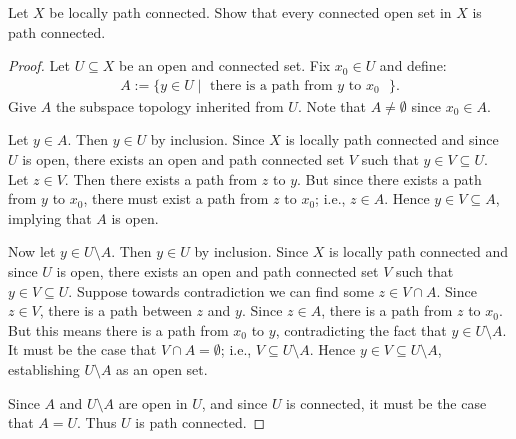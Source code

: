 \documentclass[10pt,oneside,openany]{memoir}
\begin{document}
\begin{exercise}[manual-num={4}]
Let $X$ be locally path connected. Show that every connected open set in $X$ is path connected.
\end{exercise}
    \begin{proof}
        Let $U \subseteq X$ be an open and connected set. Fix $x_0 \in U$ and define:
            \begin{equation*}
            \begin{split}
                A := \{y \in U \mid \text{ there is a path from $y$ to $x_0$ }\}.
            \end{split}
            \end{equation*}
        Give $A$ the subspace topology inherited from $U$. Note that $A \neq \emptyset$ since $x_0 \in A$.

        Let $y \in A$. Then $y \in U$ by inclusion. Since $X$ is locally path connected and since $U$ is open, there exists an open and path connected set $V$ such that $y \in V \subseteq U$. Let $z \in V$. Then there exists a path from $z$ to $y$. But since there exists a path from $y$ to $x_0$, there must exist a path from $z$ to $x_0$; i.e., $z \in A$. Hence $y \in V \subseteq A$, implying that $A$ is open.

        Now let $y \in U \setminus A$. Then $y \in U$ by inclusion. Since $X$ is locally path connected and since $U$ is open, there exists an open and path connected set $V$ such that $y \in V \subseteq U$. Suppose towards contradiction we can find some $z \in V \cap A$. Since $z \in V$, there is a path between $z$ and $y$. Since $z \in A$, there is a path from $z$ to $x_0$. But this means there is a path from $x_0$ to $y$, contradicting the fact that $y \in U \setminus A$. It must be the case that $V \cap A = \emptyset$; i.e., $V \subseteq U \setminus A$. Hence $y \in V \subseteq U \setminus A$, establishing $U\setminus A$ as an open set.

        Since $A$ and $U\setminus A$ are open in $U$, and since $U$ is connected, it must be the case that $A = U$. Thus $U$ is path connected.
    \end{proof}
\end{document}
